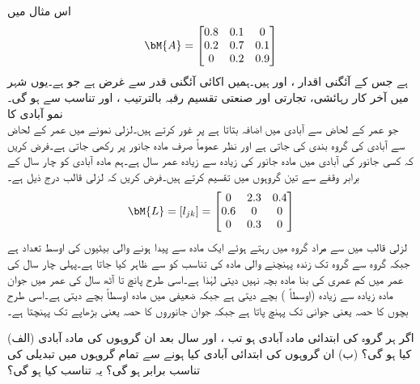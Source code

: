 اس مثال میں 
\begin{align*}
\bM{A}=\begin{bmatrix}
0.8&0.1&0\\0.2&0.7&0.1\\0&0.2&0.9
\end{bmatrix}
\end{align*}
ہے جس کے آئگنی اقدار ،  اور  ہیں۔ہمیں اکائی آئگنی قدر  سے غرض ہے جو  ہے۔یوں شہر میں آخر کار رہائشی، تجارتی اور صنعتی تقسیم رقبہ بالترتیب ،  اور  تناسب سے ہو گی۔
\quad نمو آبادی کا \\ 
 جو عمر کے لحاض سے آبادی میں اضافہ بتاتا ہے پر غور کرتے ہیں۔لزلی نمونے میں عمر کے لحاض سے آبادی کی گروہ بندی کی جاتی ہے اور نظر عموماً صرف مادہ جانور پر رکھی جاتی ہے۔فرض کریں کہ کسی جانور کی آبادی میں مادہ جانور کی زیادہ سے زیادہ عمر  سال ہے۔ہم مادہ آبادی کو چار سال کے برابر وقفے سے تین گروہوں میں تقسیم کرتے ہیں۔فرض کریں کہ لزلی قالب درج ذیل ہے۔
\begin{align*}
\bM{L}=[l_{jk}]=\begin{bmatrix} 0& 2.3&0.4\\0.6&0&0\\0&0.3&0 \end{bmatrix}
\end{align*}
لزلی قالب میں   سے مراد  گروہ میں رہتے ہوئے  ایک مادہ سے پیدا ہونے والی بیٹیوں کی اوسط تعداد ہے جبکہ گروہ  سے گروہ  تک زندہ پہنچنے والی مادہ کی تناسب کو  سے ظاہر کیا جاتا ہے۔پہلی چار سال کی عمر میں کم عمری کی بنا مادہ بچہ نہیں دیتی لہٰذا  ہے۔اسی طرح پانچ تا آٹھ سال کی عمر میں جوان مادہ زیادہ سے زیادہ (اوسطاً ) بچے  دیتی ہے جبکہ ضعیفی  میں مادہ  اوسطاً  بچے دیتی ہے۔اسی طرح بچوں کا  حصہ یعنی   جوانی تک پہنچ پاتا ہے جبکہ جوان جانوروں کا  حصہ یعنی  بڑھاپے تک پہنچتا ہے۔ 

 (الف) اگر ہر گروہ  کی ابتدائی مادہ  آبادی  ہو تب ،  اور  سال بعد ان گروہوں کی مادہ آبادی کیا ہو گی؟ (ب)  ان گروہوں کی ابتدائی آبادی کیا ہونے سے تمام گروہوں میں تبدیلی کی تناسب برابر ہو گی؟ یہ تناسب کیا ہو گی؟

